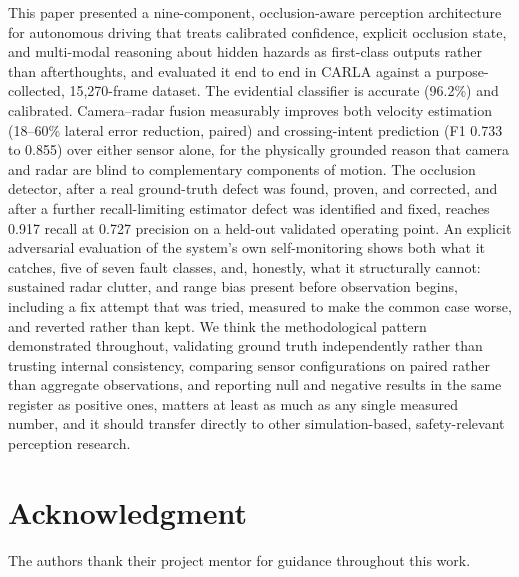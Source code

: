 \documentclass[conference]{IEEEtran}
\begin{document}
This paper presented a nine-component, occlusion-aware perception
architecture for autonomous driving that treats calibrated confidence,
explicit occlusion state, and multi-modal reasoning about hidden
hazards as first-class outputs rather than afterthoughts, and evaluated
it end to end in CARLA against a purpose-collected, 15{,}270-frame
dataset. The evidential classifier is accurate (96.2\%) and calibrated.
Camera--radar fusion measurably improves both velocity estimation
(18--60\% lateral error reduction, paired) and crossing-intent
prediction (F1 0.733 to 0.855) over either sensor alone, for the
physically grounded reason that camera and radar are blind to
complementary components of motion. The occlusion detector, after a
real ground-truth defect was found, proven, and corrected, and after a
further recall-limiting estimator defect was identified and fixed,
reaches 0.917 recall at 0.727 precision on a held-out validated
operating point. An explicit adversarial evaluation of the system's own
self-monitoring shows both what it catches, five of seven fault
classes, and, honestly, what it structurally cannot: sustained radar
clutter, and range bias present before observation begins, including a
fix attempt that was tried, measured to make the common case worse, and
reverted rather than kept. We think the methodological pattern
demonstrated throughout, validating ground truth independently rather
than trusting internal consistency, comparing sensor configurations on
paired rather than aggregate observations, and reporting null and
negative results in the same register as positive ones, matters at
least as much as any single measured number, and it should transfer
directly to other simulation-based, safety-relevant perception
research.

\section*{Acknowledgment}
The authors thank their project mentor for guidance throughout this work.
\end{document}
